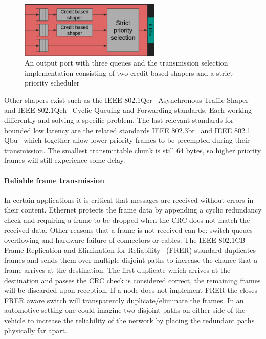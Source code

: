 \begin{figure}[htbp]
    \centering
    \includegraphics[width=0.6\textwidth]{images/cbs.png}
    \caption{An output port with three queues and the transmission selection implementation consisting of two credit based shapers and a strict priority scheduler}
    \label{fig:cbs}
\end{figure}

Other shapers exist such as the IEEE 802.1Qcr~\cite{IEEE8021Qcr} Asynchronous Traffic Shaper and IEEE 802.1Qch~\cite{IEEE8021Qch} Cyclic Queuing and Forwarding standards. Each working differently and solving a specific problem. The last relevant standards for bounded low latency are the related standards IEEE 802.3br~\cite{IEEE8023br} and IEEE 802.1 Qbu~\cite{IEEE8021Qbu} which together allow lower priority frames to be preempted during their transmission. The smallest transmittable chunk is still 64 bytes, so higher priority frames will still experience some delay.

\paragraph{Reliable frame transmission} In certain applications it is critical that messages are received without errors in their content. Ethernet protects the frame data by appending a cyclic redundancy check and requiring a frame to be dropped when the CRC does not match the received data. Other reasons that a frame is not received can be: switch queues overflowing and hardware failure of connectors or cables. The IEEE 802.1CB Frame Replication and Elimination for Reliability~\cite{IEEE8021CB} (FRER) standard duplicates frames and sends them over multiple disjoint paths to increase the chance that a frame arrives at the destination. The first duplicate which arrives at the destination and passes the CRC check is considered correct, the remaining frames will be discarded upon reception. If a node does not implement FRER the closes FRER aware switch will transparently duplicate/eliminate the frames. In an automotive setting one could imagine two disjoint paths on either side of the vehicle to increase the reliability of the network by placing the redundant paths physically far apart.

